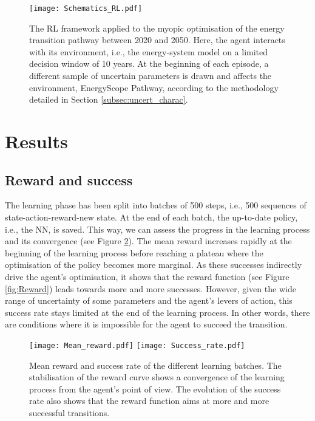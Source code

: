 \documentclass[11pt,twoside,a4paper,english]{article}
\def\ie{i.e., }
\begin{document}
\begin{figure}[!htbp]
\centering
\texttt{[image: Schematics\_RL.pdf]}
\caption{The \Acrfull{RL} framework applied to the myopic optimisation of the energy transition pathway between 2020 and 2050. Here, the agent interacts with its environment, \ie the energy-system model on a limited decision window of 10 years. At the beginning of each episode, a different sample of uncertain parameters is drawn and affects the environment, EnergyScope Pathway, according to the methodology detailed in Section \ref{subsec:uncert_charac}.}
\label{fig:Schematics_RL}
\end{figure}

\section{Results}
\label{sec:results}

\subsection{Reward and success}
\label{subsec:RL:learning:rew_succ}

The learning phase has been split into batches of 500 steps, \ie 500 sequences of state-action-reward-new state. %
At the end of each batch, the up-to-date policy, \ie the \gls{NN}, is saved. This way, we can assess the progress in the learning process and its convergence (see Figure \ref{fig:reward_success}).  The mean reward increases rapidly at the beginning of the learning process before reaching a plateau where the optimisation of the policy becomes more marginal.  As these successes indirectly drive the agent's optimisation, it shows that the reward function (see Figure \ref{fig:Reward}) leads towards more and more successes. However, given the wide range of uncertainty of some parameters and the agent's levers of action, this success rate stays limited at the end of the learning process. In other words, there are conditions where it is impossible for the agent to succeed the transition.

\begin{figure}[!htbp]
\centering
\texttt{[image: Mean\_reward.pdf]}
\texttt{[image: Success\_rate.pdf]}
\caption{Mean reward and success rate of the different learning batches. The stabilisation of the reward curve shows a convergence of the learning process from the agent's point of view. The evolution of the success rate also shows that the reward function aims at more and more successful transitions.}
\label{fig:reward_success}
\end{figure}
\end{document}
